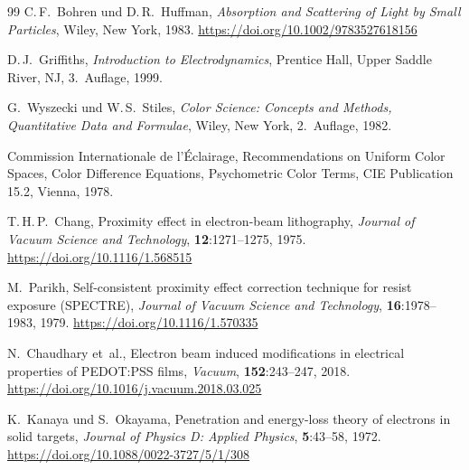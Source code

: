 ﻿\documentclass[a4paper,12pt]{article}
\theoremstyle{definition}
\begin{document}
\begin{thebibliography}{99}
		C.\,F.~Bohren und D.\,R.~Huffman,
		\newblock \emph{Absorption and Scattering of Light by Small Particles},
		\newblock Wiley, New York, 1983.
		\newblock \url{https://doi.org/10.1002/9783527618156}
		
		D.\,J.~Griffiths,
		\newblock \emph{Introduction to Electrodynamics},
		\newblock Prentice Hall, Upper Saddle River, NJ, 3.~Auflage, 1999.
		
		
		G.~Wyszecki und W.\,S.~Stiles,
		\newblock \emph{Color Science: Concepts and Methods, Quantitative Data and
			Formulae},
		\newblock Wiley, New York, 2.~Auflage, 1982.
		
		{Commission Internationale de l'\'Eclairage},
		\newblock Recommendations on Uniform Color Spaces, Color Difference Equations,
		Psychometric Color Terms,
		\newblock CIE Publication 15.2, Vienna, 1978.
		
		
		T.\,H.\,P.~Chang,
		\newblock Proximity effect in electron-beam lithography,
		\newblock \emph{Journal of Vacuum Science and Technology},
		\textbf{12}:1271--1275, 1975.
		\newblock \url{https://doi.org/10.1116/1.568515}
		
		M.~Parikh,
		\newblock Self-consistent proximity effect correction technique for resist
		exposure ({SPECTRE}),
		\newblock \emph{Journal of Vacuum Science and Technology},
		\textbf{16}:1978--1983, 1979.
		\newblock \url{https://doi.org/10.1116/1.570335}
		
		N.~Chaudhary et~al.,
		\newblock Electron beam induced modifications in electrical properties of
		{PEDOT:PSS} films,
		\newblock \emph{Vacuum}, \textbf{152}:243--247, 2018.
		\newblock \url{https://doi.org/10.1016/j.vacuum.2018.03.025}
		
		
		K.~Kanaya und S.~Okayama,
		\newblock Penetration and energy-loss theory of electrons in solid targets,
		\newblock \emph{Journal of Physics D: Applied Physics}, \textbf{5}:43--58,
		1972.
		\newblock \url{https://doi.org/10.1088/0022-3727/5/1/308}
		

\end{thebibliography}
\end{document}
